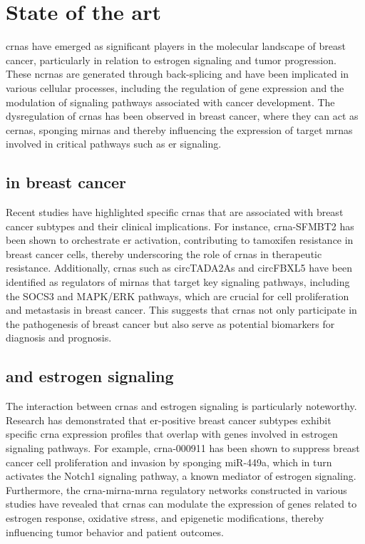 \section{State of the art}
\Glspl{crna} have emerged as significant players in the
molecular landscape of breast cancer, particularly in relation to estrogen
signaling and tumor progression.
These \glspl{ncrna} are generated through back-splicing and have been
implicated in various cellular processes, including the regulation of gene
expression and the modulation of signaling pathways associated with cancer
development\supercite{li_circrna-sfmbt2_2023,tran_new_2020}.
The dysregulation of \glspl{crna} has been observed in breast cancer, where
they can act as \glspl{cerna}, sponging \glspl{mirna} and thereby influencing
the expression of target \glspl{mrna} involved in critical pathways such as
\gls{er} signaling\supercite{nair_circular_2016,xu_circrna_2022}.

\subsection{ in breast cancer}
Recent studies have highlighted specific \glspl{crna} that are associated with
breast cancer subtypes and their clinical implications.
For instance, \gls{crna}-SFMBT2 has been shown to orchestrate \gls{er}\textalpha{}
activation, contributing to tamoxifen resistance in breast cancer cells,
thereby underscoring the role of \glspl{crna} in therapeutic
resistance\supercite{li_circrna-sfmbt2_2023}.
Additionally, \glspl{crna} such as circTADA2As and circFBXL5 have been
identified as regulators of \glspl{mirna} that target key signaling pathways,
including the SOCS3 and MAPK/ERK pathways, which are crucial for cell
proliferation and metastasis in breast
cancer\supercite{xu_circtada2as_2019,gao_hsa_circrna_0006528_2019}.
This suggests that \glspl{crna} not only participate in the pathogenesis of
breast cancer but also serve as potential biomarkers for diagnosis and
prognosis\supercite{liu_influence_2021,chen_circepsti1_2018}.

\subsection{ and estrogen signaling}
The interaction between \glspl{crna} and estrogen signaling is particularly
noteworthy.
Research has demonstrated that \gls{er}-positive breast cancer subtypes exhibit
specific \gls{crna} expression profiles that overlap with genes involved in
estrogen signaling pathways\supercite{nair_circular_2016}.
For example, \gls{crna}-000911 has been shown to suppress breast cancer cell
proliferation and invasion by sponging miR-449a, which in turn activates the
Notch1 signaling pathway, a known mediator of estrogen
signaling\supercite{wang_comprehensive_2018}.
Furthermore, the \gls{crna}-\gls{mirna}-\gls{mrna} regulatory networks
constructed in various studies have revealed that \glspl{crna} can modulate the
expression of genes related to estrogen response, oxidative stress, and
epigenetic modifications, thereby influencing tumor behavior and patient
outcomes\supercite{xu_circrna_2022,nair_circular_2016}.
